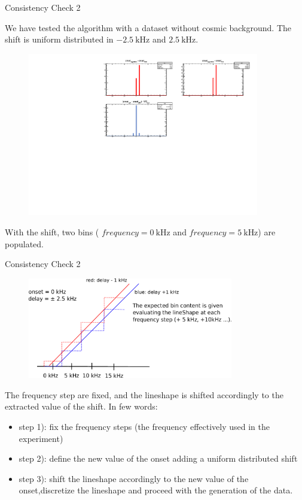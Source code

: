 \documentclass[8pt]{beamer}
\begin{document}
\begin{frame}{Consistency Check 2}

We have tested the algorithm with a dataset without cosmic background. The shift is uniform distributed in $\SI{-2.5}{\kilo \hertz}$ and $\SI{+2.5}{\kilo \hertz}$.

\begin{figure}
\includegraphics[width = 0.9\textwidth]{../Plot/OnsetResult7.pdf}
\end{figure} 

With the shift, two bins ( $frequency = \SI{0}{\kilo \hertz}$ and $frequency = \SI{5}{\kilo \hertz}$) are populated.
\end{frame}

\begin{frame}{Consistency Check 2}


\begin{figure}
\includegraphics[width = 0.8\textwidth]{ExplainingAlgorithm2.pdf}
\end{figure}

The frequency step are fixed, and the lineshape is shifted accordingly to the extracted value of the shift. In few words:
\begin{itemize}
\item step 1): fix the frequency steps (the frequency effectively used in the experiment)
\item step 2): define the new value of the onset adding a uniform distributed shift  
\item step 3): shift the lineshape accordingly to the new value of the onset,\newline discretize the lineshape and proceed with the generation of the data.
\end{itemize}
\end{frame}
\end{document}
